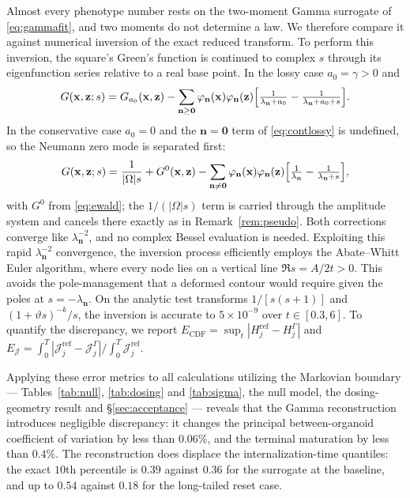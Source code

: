 \documentclass[pdflatex,sn-mathphys-num]{sn-jnl}
\numberwithin{equation}{section}
\theoremstyle{thmstyleone}%
\theoremstyle{definition}
\theoremstyle{remark}
\begin{document}
Almost every phenotype number rests on the two-moment Gamma surrogate of
\eqref{eq:gammafit}, and two moments do not determine a law. We therefore
compare it against numerical inversion of the exact reduced transform.
To perform this inversion, the square's Green's function is continued to complex $s$ through its
eigenfunction series relative to a real base point. In the lossy case $a_0=\gamma>0$ and
\begin{equation}
G(\mathbf x,\mathbf z;s)=G_{a_0}(\mathbf x,\mathbf z)
-\sum_{\mathbf n\ge\mathbf 0}\varphi_{\mathbf n}(\mathbf x)
\varphi_{\mathbf n}(\mathbf z)
\Bigl[\tfrac1{\lambda_{\mathbf n}+a_0}-\tfrac1{\lambda_{\mathbf n}+a_0+s}\Bigr].
\label{eq:contlossy}
\end{equation}
In the conservative case $a_0=0$ and the $\mathbf n=\mathbf0$ term of
\eqref{eq:contlossy} is undefined, so the Neumann zero mode is separated first:
\[
G(\mathbf x,\mathbf z;s)=\frac1{|\Omega|s}+G^0(\mathbf x,\mathbf z)
-\sum_{\mathbf n\neq\mathbf 0}\varphi_{\mathbf n}(\mathbf x)
\varphi_{\mathbf n}(\mathbf z)
\Bigl[\tfrac1{\lambda_{\mathbf n}}-\tfrac1{\lambda_{\mathbf n}+s}\Bigr],
\]
with $G^0$ from \eqref{eq:ewald}; the $1/(|\Omega|s)$ term is carried through
the amplitude system and cancels there exactly as in Remark~\ref{rem:pseudo}.
Both corrections converge like $\lambda_{\mathbf n}^{-2}$, and no complex Bessel
evaluation is needed. Exploiting this rapid $\lambda_{\mathbf n}^{-2}$ convergence, the inversion process efficiently employs the Abate--Whitt Euler algorithm, where every node lies on a vertical line $\Re s=A/2t>0$. This avoids the pole-management that a deformed contour would
require given the poles at $s=-\lambda_{\mathbf n}$. On the analytic test
transforms $1/[s(s+1)]$ and $(1+\vartheta s)^{-k}/s$, the inversion is accurate
to $5\times10^{-9}$ over $t\in[0.3,6]$. To quantify the discrepancy, we report
$E_{\mathrm{CDF}}=\sup_t|H^{\mathrm{ref}}_j-H^\Gamma_j|$ and
$E_{\mathcal J}=\int_0^T|\mathcal J^{\mathrm{ref}}_j-\mathcal J^\Gamma_j|
/\int_0^T\mathcal J^{\mathrm{ref}}_j$.

Applying these error metrics to all calculations utilizing the Markovian boundary --- Tables~\ref{tab:null}, \ref{tab:dosing} and \ref{tab:sigma}, the null model, the dosing-geometry result and \S\ref{sec:acceptance} --- reveals that the Gamma reconstruction introduces negligible discrepancy: it changes the principal between-organoid coefficient of variation by less than $0.06\%$, and the terminal maturation by less than $0.4\%$. The reconstruction does displace the internalization-time quantiles: the exact $10$th percentile is
$0.39$ against $0.36$ for the surrogate at the baseline, and up to
$0.54$ against $0.18$ for the long-tailed reset case.
\end{document}
